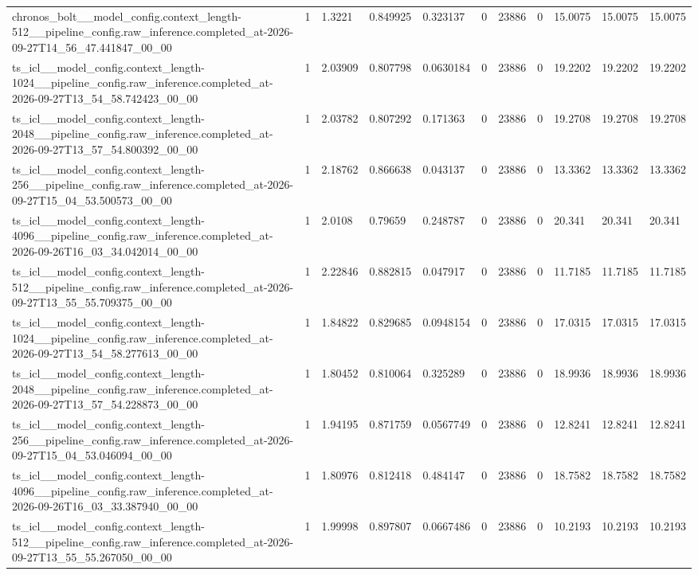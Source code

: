 \begin{tabular}{lllllllllll}
chronos\_bolt\_\_model\_config.context\_length-512\_\_pipeline\_config.raw\_inference.completed\_at-2026-09-27T14\_56\_47.441847\_00\_00 & 1 & 1.3221 & 0.849925 & 0.323137 & 0 & 23886 & 0 & 15.0075 & 15.0075 & 15.0075 \\
ts\_icl\_\_model\_config.context\_length-1024\_\_pipeline\_config.raw\_inference.completed\_at-2026-09-27T13\_54\_58.742423\_00\_00 & 1 & 2.03909 & 0.807798 & 0.0630184 & 0 & 23886 & 0 & 19.2202 & 19.2202 & 19.2202 \\
ts\_icl\_\_model\_config.context\_length-2048\_\_pipeline\_config.raw\_inference.completed\_at-2026-09-27T13\_57\_54.800392\_00\_00 & 1 & 2.03782 & 0.807292 & 0.171363 & 0 & 23886 & 0 & 19.2708 & 19.2708 & 19.2708 \\
ts\_icl\_\_model\_config.context\_length-256\_\_pipeline\_config.raw\_inference.completed\_at-2026-09-27T15\_04\_53.500573\_00\_00 & 1 & 2.18762 & 0.866638 & 0.043137 & 0 & 23886 & 0 & 13.3362 & 13.3362 & 13.3362 \\
ts\_icl\_\_model\_config.context\_length-4096\_\_pipeline\_config.raw\_inference.completed\_at-2026-09-26T16\_03\_34.042014\_00\_00 & 1 & 2.0108 & 0.79659 & 0.248787 & 0 & 23886 & 0 & 20.341 & 20.341 & 20.341 \\
ts\_icl\_\_model\_config.context\_length-512\_\_pipeline\_config.raw\_inference.completed\_at-2026-09-27T13\_55\_55.709375\_00\_00 & 1 & 2.22846 & 0.882815 & 0.047917 & 0 & 23886 & 0 & 11.7185 & 11.7185 & 11.7185 \\
ts\_icl\_\_model\_config.context\_length-1024\_\_pipeline\_config.raw\_inference.completed\_at-2026-09-27T13\_54\_58.277613\_00\_00 & 1 & 1.84822 & 0.829685 & 0.0948154 & 0 & 23886 & 0 & 17.0315 & 17.0315 & 17.0315 \\
ts\_icl\_\_model\_config.context\_length-2048\_\_pipeline\_config.raw\_inference.completed\_at-2026-09-27T13\_57\_54.228873\_00\_00 & 1 & 1.80452 & 0.810064 & 0.325289 & 0 & 23886 & 0 & 18.9936 & 18.9936 & 18.9936 \\
ts\_icl\_\_model\_config.context\_length-256\_\_pipeline\_config.raw\_inference.completed\_at-2026-09-27T15\_04\_53.046094\_00\_00 & 1 & 1.94195 & 0.871759 & 0.0567749 & 0 & 23886 & 0 & 12.8241 & 12.8241 & 12.8241 \\
ts\_icl\_\_model\_config.context\_length-4096\_\_pipeline\_config.raw\_inference.completed\_at-2026-09-26T16\_03\_33.387940\_00\_00 & 1 & 1.80976 & 0.812418 & 0.484147 & 0 & 23886 & 0 & 18.7582 & 18.7582 & 18.7582 \\
ts\_icl\_\_model\_config.context\_length-512\_\_pipeline\_config.raw\_inference.completed\_at-2026-09-27T13\_55\_55.267050\_00\_00 & 1 & 1.99998 & 0.897807 & 0.0667486 & 0 & 23886 & 0 & 10.2193 & 10.2193 & 10.2193 \\

\end{tabular}
